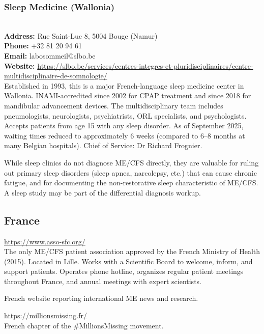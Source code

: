 \subsubsection{Sleep Medicine (Wallonia)}

\begin{description}[style=nextline]
\item[Centre Multidisciplinaire de Somnologie -- Clinique Saint-Luc Bouge] \hfill\\
\textbf{Address:} Rue Saint-Luc 8, 5004 Bouge (Namur)\\
\textbf{Phone:} +32 81 20 94 61\\
\textbf{Email:} labosommeil@slbo.be\\
\textbf{Website:} \url{https://slbo.be/services/centres-integres-et-pluridisciplinaires/centre-multidisciplinaire-de-somnologie/}\\
Established in 1993, this is a major French-language sleep medicine center in Wallonia. INAMI-accredited since 2002 for CPAP treatment and since 2018 for mandibular advancement devices. The multidisciplinary team includes pneumologists, neurologists, psychiatrists, ORL specialists, and psychologists. Accepts patients from age 15 with any sleep disorder. As of September 2025, waiting times reduced to approximately 6 weeks (compared to 6--8 months at many Belgian hospitals). Chief of Service: Dr Richard Frognier.
\end{description}

\begin{remark}
While sleep clinics do not diagnose ME/CFS directly, they are valuable for ruling out primary sleep disorders (sleep apnea, narcolepsy, etc.) that can cause chronic fatigue, and for documenting the non-restorative sleep characteristic of ME/CFS. A sleep study may be part of the differential diagnosis workup.
\end{remark}

\subsection{France}
\label{subsec:france-orgs}

\begin{description}[style=nextline]
\item[ASFC (Association française du Syndrome de Fatigue Chronique)] \hfill \url{https://www.asso-sfc.org/}\\
The only ME/CFS patient association approved by the French Ministry of Health (2015). Located in Lille. Works with a Scientific Board to welcome, inform, and support patients. Operates phone hotline, organizes regular patient meetings throughout France, and annual meetings with expert scientists.

\item[EM Action France] \hfill French website reporting international ME news and research.

\item[Millions Missing France] \hfill \url{https://millionsmissing.fr/}\\
French chapter of the \#MillionsMissing movement.
\end{description}

